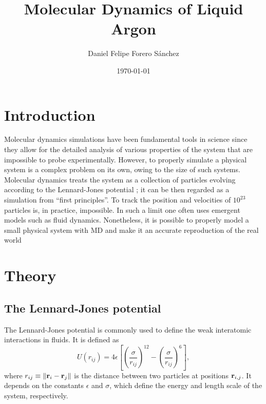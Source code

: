 \documentclass[%
aip,
jmp,%
amsmath,amssymb,
preprint,%
reprint,%
notitlepage,
a4paper]{revtex4-1}
\begin{document}
	
	
	\title[Computer Simulation of Physical Systems]{Molecular Dynamics of Liquid Argon}%
	
	\author{Daniel Felipe Forero Sánchez}
	
	
	\date{\today}%

	
	\begin{abstract}
		

	\end{abstract}


	\maketitle

	
	\section{Introduction}
	Molecular dynamics simulations have been fundamental tools in science since they allow for the detailed analysis of various properties of the system that are impossible to probe experimentally. However, to properly simulate a physical system is a complex problem on its own, owing to the size of such systems. Molecular dynamics treats the system as a collection of particles evolving according to the Lennard-Jones potential \cite{Jones1924}; it can be then regarded as a simulation from ``first principles''. To track the position and velocities of $10^{23}$ particles is, in practice, impossible. In such a limit one often uses emergent models such as fluid dynamics. Nonetheless, it is possible to properly model a small physical system with MD and make it an accurate reproduction of the real world \cite{Rahman1964}
\section{Theory}
\subsection{The Lennard-Jones potential}
The Lennard-Jones potential \cite{Jones1924} is commonly used to define the weak interatomic interactions in fluids. It is defined as
\begin{equation}
U(r_{ij}) = 4\epsilon\left[\left(\frac{\sigma}{r_{ij}}\right)^{12} - \left(\frac{\sigma}{r_{ij}}\right)^{6}\right],
\label{eq:lennardjones}
\end{equation}
where $r_{ij} \equiv \norm{\vb{r}_i - \vb{r}_j}$ is the distance between two particles at positions $\vb{r}_{i,j}$. It depends on the constants $\epsilon$ and $\sigma$, which define the energy and length scale of the system, respectively.
\end{document}
